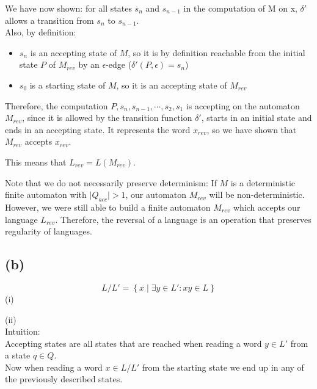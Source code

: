 \begin{itemize}
    We have now shown: for all states $s_{n}$ and $s_{n-1}$ in the computation of M on x, $\delta'$ allows a transition from $s_{n}$ to $s_{n-1}$.\\
    Also, by definition:
    \begin{itemize}
        \item $s_{n}$ is an accepting state of $M$, so it is by definition reachable from the initial state $P$ of $M_{rev}$ by an $\epsilon$-edge ($\delta'(P,\epsilon)=s_{n}$)
        \item $s_{0}$ is a starting state of $M$, so it is an accepting state of $M_{rev}$
    \end{itemize}
    Therefore, the computation $P,s_{n},s_{n-1},\cdots,s_{2},s_{1}$ is accepting on the automaton $M_{rev}$, since it is allowed by the transition function $\delta'$, starts in an initial state and ends in an accepting state. It represents the word $x_{rev}$, so we have shown that $M_{rev}$ accepts $x_{rev}$.
\end{itemize}
This means that $L_{rev}=L(M_{rev})$. \qedsymbol{}

Note that we do not necessarily preserve determinism: If $M$ is a deterministic finite automaton with $\lvert Q_{acc} \rvert > 1$, our automaton $M_{rev}$ will be non-deterministic.\\
However, we were still able to build a finite automaton $M_{rev}$ which accepts our language $L_{rev}$. Therefore, the reversal of a language is an operation that preserves regularity of languages.

\subsection{(b)}
$$L/L' = \left\{ x\mid \exists y \in L' : xy \in L\right\}$$
\noindent (i)\\

\noindent (ii)\\
Intuition:\\
Accepting states are all states that are reached when reading a word $y \in L'$ from a state $q \in Q$.\\
Now when reading a word $x \in L/L'$ from the starting state we end up in any of the previously described states.

